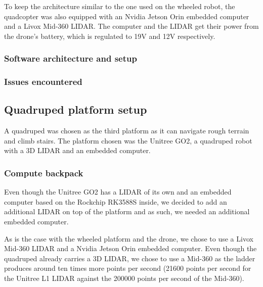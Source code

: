 \documentclass[11pt]{article}
\begin{document}
                To keep the architecture similar to the one used on the wheeled robot, the quadcopter was also equipped with an Nvidia Jetson Orin embedded computer and a Livox Mid-360 LIDAR. The computer and the LIDAR get their power from the drone's battery, which is regulated to 19V and 12V respectively.

            \subsubsection{Software architecture and setup}
                
        
            \subsubsection{Issues encountered}
            
    \subsection{Quadruped platform setup}

        A quadruped was chosen as the third platform as it can navigate rough terrain and climb stairs. The platform chosen was the Unitree GO2, a quadruped robot with a 3D LIDAR and an embedded computer.

        \subsubsection{Compute backpack}

        Even though the Unitree GO2 has a LIDAR of its own and an embedded computer based on the Rockchip RK3588S inside, we decided to add an additional LIDAR on top of the platform and as such, we needed an additional embedded computer.

        As is the case with the wheeled platform and the drone, we chose to use a Livox Mid-360 LIDAR and a Nvidia Jetson Orin embedded computer. Even though the quadruped already carries a 3D LIDAR, we chose to use a Mid-360 as the ladder produces around ten times more points per second (21600 points per second for the Unitree L1 LIDAR against the 200000 points per second of the Mid-360).
\end{document}
